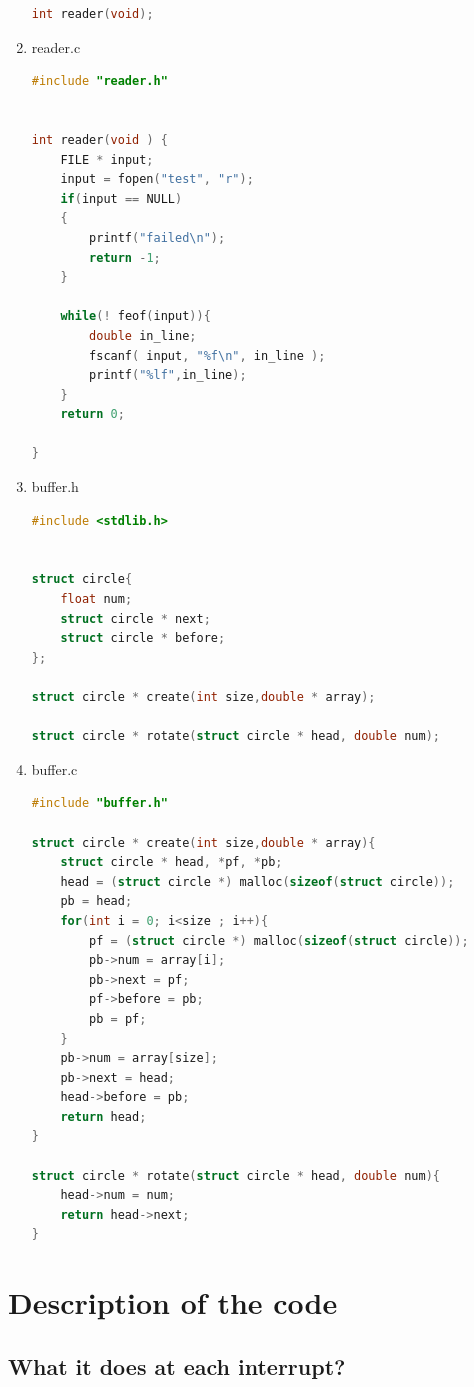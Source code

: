 \documentclass[11pt]{scrartcl}
\begin{document}
\begin{enumerate}
\begin{lstlisting}[language=C]
int reader(void);
\end{lstlisting}
\item reader.c
\begin{lstlisting}[language=C]
#include "reader.h"


int reader(void ) {
    FILE * input;
    input = fopen("test", "r");
    if(input == NULL)
    {
        printf("failed\n");
        return -1;
    }

    while(! feof(input)){
        double in_line;
        fscanf( input, "%f\n", in_line );
        printf("%lf",in_line);
    }
    return 0;

}
\end{lstlisting}
\item buffer.h
\begin{lstlisting}[language=C]
#include <stdlib.h>


struct circle{
    float num;
    struct circle * next;
    struct circle * before;
};

struct circle * create(int size,double * array);

struct circle * rotate(struct circle * head, double num);

\end{lstlisting}
\item buffer.c
\begin{lstlisting}[language=C]
#include "buffer.h"

struct circle * create(int size,double * array){
    struct circle * head, *pf, *pb;
    head = (struct circle *) malloc(sizeof(struct circle));
    pb = head;
    for(int i = 0; i<size ; i++){
        pf = (struct circle *) malloc(sizeof(struct circle));
        pb->num = array[i];
        pb->next = pf;
        pf->before = pb;
        pb = pf;
    }
    pb->num = array[size];
    pb->next = head;
    head->before = pb;
    return head;
}

struct circle * rotate(struct circle * head, double num){
    head->num = num;
    return head->next;
}

\end{lstlisting}
\end{enumerate}

\section{Description of the code}
\subsection{What it does at each interrupt?}
\end{document}

